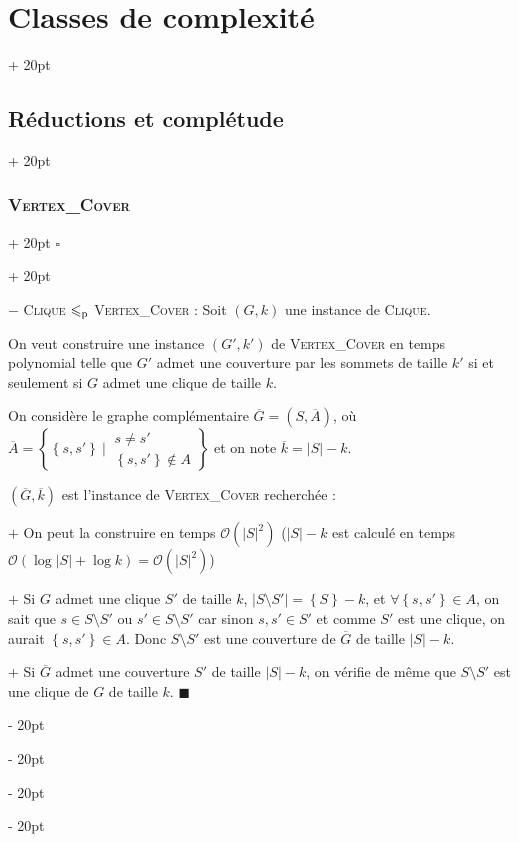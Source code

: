\documentclass[a4paper, 12pt, twoside]{article}
\newcommand{\cj}[1]{\overline{#1}} %
\newcommand{\lr}[1]{\left( #1 \right)}
\newcommand{\set}[1]{\left\{ #1 \right\}}
\newcommand{\abs}[1]{\left\lvert #1 \right\rvert}
\renewcommand{\le}{\leqslant}
\newcommand{\ind}[1][20pt]{\advance\leftskip + #1}
\newcommand{\deind}[1][20pt]{\advance\leftskip - #1}
\newenvironment{indt}[2][20pt]{#2 \par \ind[#1]}{\par \deind} %
\newenvironment{proof}[1][{}]{\begin{indt}{$\square$ #1}}{$\blacksquare$ \end{indt}}
\begin{document}
\begin{indt}{\section{Classes de complexité}}
\begin{indt}{\subsection{Réductions et complétude}}
\begin{indt}{\subsubsection{\textsc{Vertex\_Cover}}}
\begin{proof}
                    \vspace{6pt}
                    
                    $-$ \textsc{Clique} $\le_{\rm p}$ \textsc{Vertex\_Cover} :
                    Soit $(G, k)$ une instance de \textsc{Clique}.

                    On veut construire une instance $(G', k')$ de \textsc{Vertex\_Cover} en temps polynomial telle que $G'$ admet une couverture par les sommets de taille $k'$ si et seulement si $G$ admet une clique de taille $k$.

                    On considère le graphe complémentaire $\cj G = (S, \cj A)$, où
                    $
                        \cj A =
                        \set{
                            \set{s, s'}\ |\
                            \begin{array}{|l}
                                s \neq s'
                                \\
                                \set{s, s'} \notin A
                            \end{array}
                        }
                    $
                    et on note $\cj k = \abs S - k$.

                    \vspace{6pt}
                    
                    $(\cj G, \cj k)$ est l'instance de \textsc{Vertex\_Cover} recherchée :

                    $+$ On peut la construire en temps $\mathcal O\!\lr{\abs S ^2}$ ($\abs S - k$ est calculé en temps $\mathcal O(\log \abs S + \log k) = \mathcal O\!\lr{\abs S ^2}$)

                    $+$ Si $G$ admet une clique $S'$ de taille $k$, $\abs{S \setminus S'} = \set S - k$, et $\forall \set{s, s'} \in A$, on sait que $s \in S \setminus S'$ ou $s' \in S \setminus S'$ car sinon $s, s' \in S'$ et comme $S'$ est une clique, on aurait $\set{s, s'} \in A$.
                    Donc $S \setminus S'$ est une couverture de $\cj G$ de taille $\abs S - k$.

                    $+$ Si $\cj G$ admet une couverture $S'$ de taille $\abs S - k$, on vérifie de même que $S \setminus S'$ est une clique de $G$ de taille $k$.
                \end{proof}
            \end{indt}

            \vspace{12pt}
            

\end{indt}
\end{indt}
\end{document}
